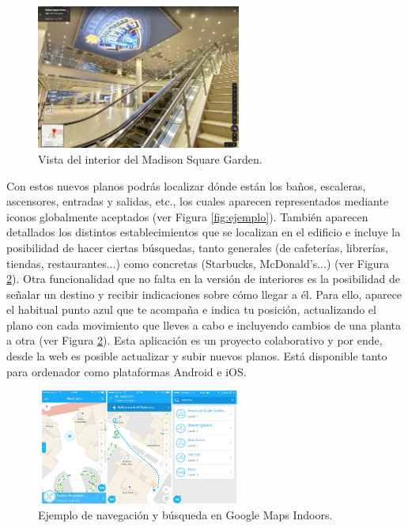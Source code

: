 \begin{figure}[t]
	\centering
	\includegraphics[width=0.6\textwidth]{Imagenes/Estadodelacuestion/MadSq3}
	\caption{Vista del interior del Madison Square Garden. }
	\label{fig:ejemplo2}
\end{figure}

Con estos nuevos planos podrás localizar dónde están los baños, escaleras, ascensores, entradas y salidas, etc., los cuales aparecen representados mediante iconos globalmente aceptados (ver Figura \ref{fig:ejemplo}). También aparecen detallados los distintos establecimientos que se localizan en el edificio e incluye la posibilidad de hacer ciertas búsquedas, tanto generales (de cafeterías, librerías, tiendas, restaurantes...) como concretas (Starbucks, McDonald's...) (ver Figura \ref{fig:ejemplo3}). Otra funcionalidad que no falta en la versión de interiores es la posibilidad de señalar un destino y recibir indicaciones sobre cómo llegar a él. Para ello, aparece el habitual punto azul que te acompaña e indica tu posición, actualizando el plano con cada movimiento que lleves a cabo e incluyendo cambios de una planta a otra (ver Figura \ref{fig:ejemplo3}). Esta aplicación es un proyecto colaborativo y por ende, desde la web es posible actualizar y subir nuevos planos. Está disponible tanto para ordenador como plataformas Android e iOS.

\begin{figure}[t]
	\centering
	\includegraphics[width=0.6\textwidth]{Imagenes/Estadodelacuestion/GMapsInd}
	\caption{Ejemplo de navegación y búsqueda en Google Maps Indoors. }
	\label{fig:ejemplo3}
\end{figure}

